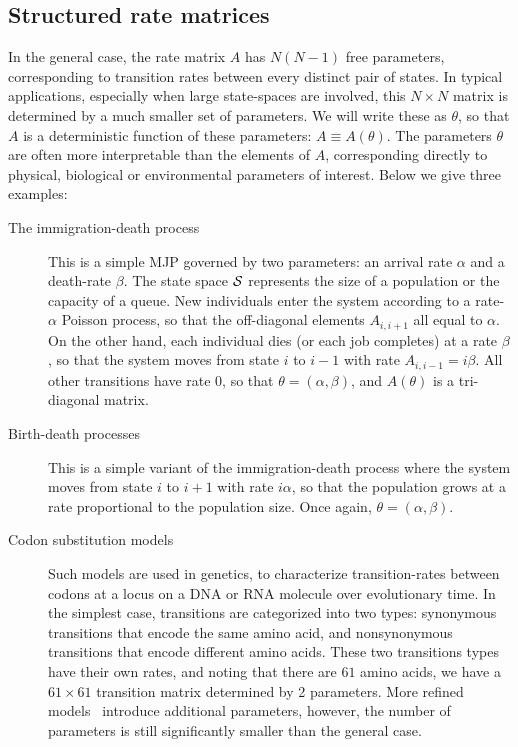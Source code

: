 \subsection{Structured rate matrices}
In the general case, the rate matrix $A$ has $N(N-1)$ free parameters,
corresponding to transition rates between every distinct pair of states. 
In typical applications, especially when large state-spaces
are involved, this $N \times N$ matrix is determined by a much smaller
set of parameters. We will write these as $\theta$, so that 
$A$ is a deterministic function of these parameters: 
$A \equiv A(\theta)$. The parameters $\theta$ are often more 
interpretable than the elements of $A$, corresponding directly to
physical, biological or environmental parameters of interest. 
Below we give three examples:
\begin{description}
  \item[The immigration-death process] This is a simple MJP governed
    by two parameters: an arrival rate $\alpha$ and a death-rate
    $\beta$. The state space ${\mathcal S}$ represents the size of a 
    population or the capacity of a queue. New individuals
    enter the system according to a rate-$\alpha$ Poisson process,
    so that the off-diagonal elements $A_{i,i+1}$ all equal to $\alpha$.
    On the other hand, each individual dies (or each job completes) 
    at a rate $\beta$, so that the system moves from state $i$ to 
    $i-1$ with rate $A_{i,i-1}=i\beta$.
    All other transitions have rate $0$, so that $\theta = (\alpha,\beta)$,
    and $A(\theta)$ is a tri-diagonal matrix.
  \item[Birth-death processes] This is a simple variant of the
    immigration-death process where the system moves from state $i$ 
    to $i+1$ with rate $i\alpha$, so that the population grows at a 
    rate proportional to the population size. Once again, 
    $\theta=(\alpha,\beta)$.
  \item[Codon substitution models] Such models are used in genetics,
    to characterize transition-rates between codons at a locus on
    a DNA or RNA molecule over evolutionary time. In the simplest case,
    transitions are categorized into two types: synonymous transitions
    that encode the same amino acid, and nonsynonymous 
    transitions that encode different amino acids. 
    These two transitions types have their own rates, and noting that 
    there are $61$ amino acids, we have a $61\times 61$ transition
    matrix determined by 2 parameters. More refined models~\cite[e.g.][]{goldman1994codon} introduce
    additional parameters, however, the number of parameters is still
    significantly smaller than the general case.
\end{description}
